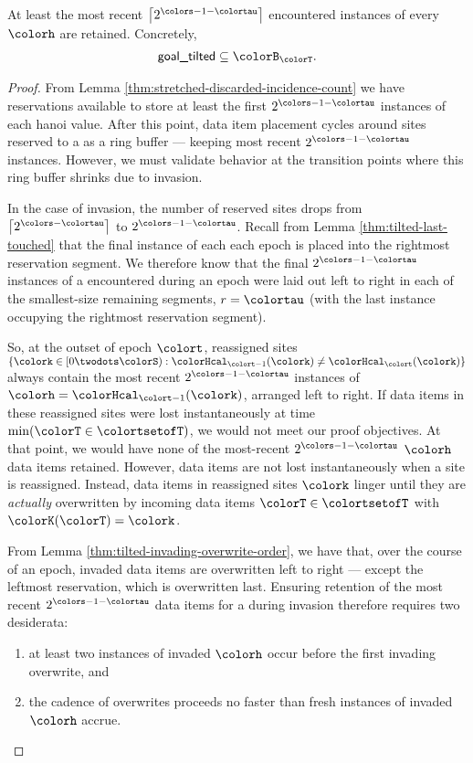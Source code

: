 \begin{lemma}
\label{thm:tilted-most-recent-retained}
At least the most recent $\left\lceil2^{\colors - 1 - \colortau}\right\rceil$ encountered instances of every \hv{} $\colorh$ are retained.
Concretely,
\begin{align*}
\textsf{goal\_tilted} \subseteq \colorB_{\colorT}.
\end{align*}
\end{lemma}
\begin{proof}
From Lemma \ref{thm:stretched-discarded-incidence-count} we have reservations available to store at least the first $2^{\colors - 1 - \colortau}$ instances of each hanoi value.
After this point, data item placement cycles around sites reserved to a \hv as a ring buffer --- keeping most recent $2^{\colors - 1 - \colortau}$ instances.
However, we must validate behavior at the transition points where this ring buffer shrinks due to invasion.

In the case of invasion, the number of reserved sites drops from $\left\lceil 2^{\colors - \colortau} \right\rceil$ to $2^{\colors - 1 - \colortau}$.
Recall from Lemma \ref{thm:tilted-last-touched} that the final instance of each \hv{} each epoch is placed into the rightmost reservation segment.
We therefore know that the final $2^{\colors - 1 - \colortau}$ instances of a \hv{} encountered during an epoch were laid out left to right in each of the smallest-size remaining segments, $r = \colortau$ (with the last instance occupying the rightmost reservation segment).

So, at the outset of epoch $\colort$, reassigned sites $\{\colork \in [0\twodots\colorS) : \colorHcal_{\colort - 1}(\colork) \neq \colorHcal_{\colort}(\colork)\}$ always contain the most recent $2^{\colors - 1 - \colortau}$ instances of \hv{} $\colorh = \colorHcal_{\colort - 1}(\colork)$, arranged left to right.
If data items in these reassigned sites were lost instantaneously at time $\min(\colorT \in \colortsetofT)$, we would not meet our proof objectives.
At that point, we would have none of the most-recent $2^{\colors - 1 - \colortau}$ \hv{} $\colorh$ data items retained.
However, data items are not lost instantaneously when a site is reassigned.
Instead, data items in reassigned sites $\colork$ linger until they are \textit{actually} overwritten by incoming data items $\colorT \in \colortsetofT$ with $\colorK(\colorT) = \colork$.

From Lemma \ref{thm:tilted-invading-overwrite-order}, we have that, over the course of an epoch, invaded data items are overwritten left to right --- except the leftmost reservation, which is overwritten last.
Ensuring retention of the most recent $2^{\colors - 1 - \colortau}$ data items for a \hv{} during invasion therefore requires two desiderata:
\begin{enumerate}
\item at least two instances of invaded \hv{} $\colorh$ occur before the first invading overwrite, and
\item the cadence of overwrites proceeds no faster than fresh instances of invaded \hv{} $\colorh$ accrue.
\end{enumerate}



\end{proof}

